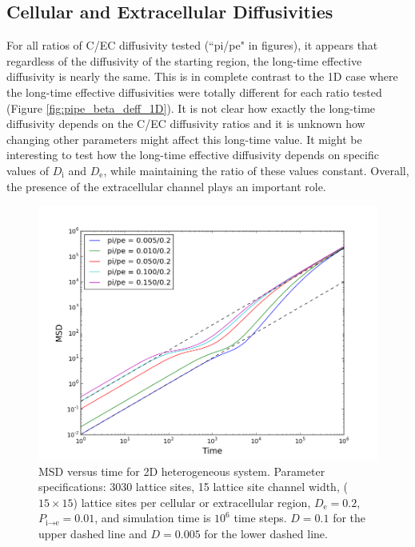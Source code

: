 \clearpage
\subsection{Cellular and Extracellular Diffusivities}
\label{sec:2D-cellular-extracellular-diffusivities}	
	
	For all ratios of C/EC diffusivity tested (``pi/pe" in figures), it appears that regardless of the diffusivity of the starting region, the long-time effective diffusivity is nearly the same. This is in complete contrast to the 1D case where the long-time effective diffusivities were totally different for each ratio tested (Figure \ref{fig:pipe_beta_deff_1D}). It is not clear how exactly the long-time diffusivity depends on the C/EC diffusivity ratios and it is unknown how changing other parameters might affect this long-time value. It might be interesting to test how the long-time effective diffusivity depends on specific values of $ D_\textrm{i} $ and $ D_\textrm{e} $, while maintaining the ratio of these values constant. Overall, the presence of the extracellular channel plays an important role.
	
	\begin{figure}[h]
		\centering
		\includegraphics[width=1.0\linewidth]{../images/2D/pipe_msd_2D}
		\caption[2D: MSD for varying diffusivities]{MSD versus time for 2D heterogeneous system. Parameter specifications: 3030 lattice sites, 15 lattice site channel width, ($ 15 \times 15 $) lattice sites per cellular or extracellular region, $ D_\textrm{e} = 0.2 $, $ P_{\textrm{i} \rightarrow \textrm{e}} = 0.01 $, and simulation time is $ 10^6 $ time steps. $ D = 0.1 $ for the upper dashed line and $ D = 0.005 $ for the lower dashed line.}
		\label{fig:pipe_msd_2D}
	\end{figure}
	

